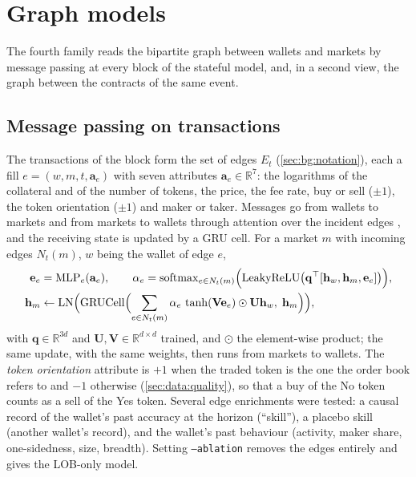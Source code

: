 \section{Graph models}
\label{sec:models:graph}

The fourth family reads the bipartite graph between wallets and markets by message passing
at every block of the stateful model, and, in a second view, the graph between the contracts
of the same event.

\subsection{Message passing on transactions}
\label{sec:models:mp}

The transactions of the block form the set of edges $E_t$ (\cref{sec:bg:notation}), each
a fill $e = (w, m, t, \mathbf{a}_e)$ with seven attributes $\mathbf{a}_e \in \mathbb{R}^7$:
the logarithms of the collateral and of the number of tokens, the price, the fee rate,
buy or sell ($\pm 1$), the token orientation ($\pm 1$) and maker or taker.  Messages go
from wallets to markets and from markets to wallets through attention over the incident
edges \cite{velickovic2018gat}, and the receiving state is updated by a GRU cell.  For a
market $m$ with incoming edges $N_t(m)$, $w$ being the wallet of edge $e$,
\begin{align}
  \mathbf{e}_e &= \operatorname{MLP}_{e}(\mathbf{a}_e), \qquad
  \alpha_e = \operatorname{softmax}_{e \in N_t(m)}\Bigl(\operatorname{LeakyReLU}\bigl(
  \mathbf{q}^{\top}[\mathbf{h}_w, \mathbf{h}_m, \mathbf{e}_e]\bigr)\Bigr),
  \label{eq:mp-attention} \\
  \mathbf{h}_m &\leftarrow \operatorname{LN}\Bigl(\operatorname{GRUCell}\Bigl(
  \sum_{e \in N_t(m)} \alpha_e \, \tanh(\mathbf{V}\mathbf{e}_e) \odot \mathbf{U}\mathbf{h}_w,
  \; \mathbf{h}_m\Bigr)\Bigr),
  \label{eq:mp-update}
\end{align}
with $\mathbf{q} \in \mathbb{R}^{3d}$ and $\mathbf{U}, \mathbf{V} \in \mathbb{R}^{d \times d}$
trained, and $\odot$ the element-wise product; the same update, with the same weights,
then runs from markets to wallets.  The \emph{token orientation} attribute is $+1$ when
the traded token is the one the order book refers to and $-1$ otherwise
(\cref{sec:data:quality}), so that a buy of the No token counts as a sell of the Yes
token.  Several
edge enrichments were tested: a causal record of the wallet's past accuracy at the
horizon (``skill''), a placebo skill (another wallet's record), and the wallet's past
behaviour (activity, maker share, one-sidedness, size, breadth).  Setting
\texttt{--ablation} removes the edges entirely and gives the LOB-only model.

